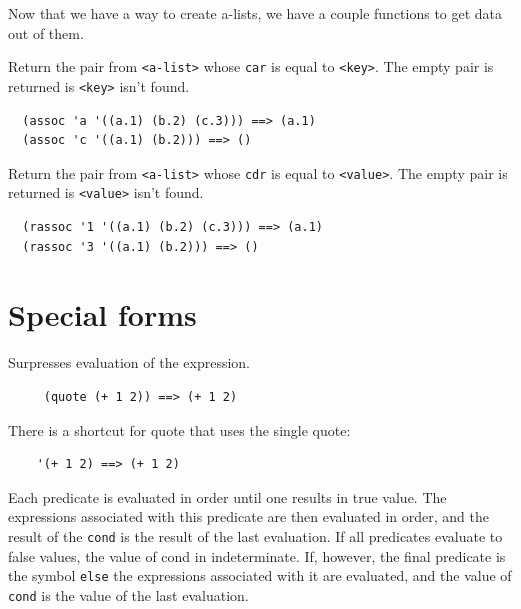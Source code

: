 \documentclass[12pt]{article}
\begin{document}
Now that we have a way to create a-lists, we have a couple functions
to get data out of them.\\


Return the pair from \verb|<a-list>| whose \verb|car| is equal to
\verb|<key>|. The empty pair is returned is \verb|<key>| isn't found.

\begin{verbatim}
  (assoc 'a '((a.1) (b.2) (c.3))) ==> (a.1)
  (assoc 'c '((a.1) (b.2))) ==> ()
\end{verbatim}


Return the pair from \verb|<a-list>| whose \verb|cdr| is equal to
\verb|<value>|. The empty pair is returned is \verb|<value>| isn't found.

\begin{verbatim}
  (rassoc '1 '((a.1) (b.2) (c.3))) ==> (a.1)
  (rassoc '3 '((a.1) (b.2))) ==> ()

\end{verbatim}

\section{Special forms}


Surpresses evaluation of the expression.

\begin{verbatim}
     (quote (+ 1 2)) ==> (+ 1 2)
\end{verbatim}

There is a shortcut for quote that uses the single quote:

\begin{verbatim}
    '(+ 1 2) ==> (+ 1 2)
\end{verbatim}


Each predicate is evaluated in order until one results in true value.
The expressions associated with this predicate are then evaluated in order,
and the result of the \verb|cond| is the result of the last
evaluation. If all predicates evaluate to false values, the value of
cond in indeterminate. If, however, the final predicate is the symbol
\verb|else| the expressions associated with it are evaluated, and the
value of \verb|cond| is the value of the last evaluation.
\end{document}
